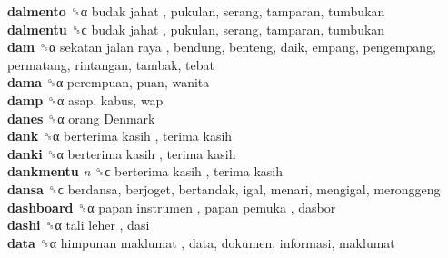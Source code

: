 \textbf{dalmento} ␝α   budak jahat , pukulan, serang, tamparan, tumbukan  \\
\textbf{dalmentu} ␝ϲ   budak jahat , pukulan, serang, tamparan, tumbukan  \\
\textbf{dam} ␝α   sekatan jalan raya , bendung, benteng, daik, empang, pengempang, permatang, rintangan, tambak, tebat  \\
\textbf{dama} ␝α  perempuan, puan, wanita  \\
\textbf{damp} ␝α  asap, kabus, wap  \\
\textbf{danes} ␝α   orang Denmark   \\
\textbf{dank} ␝α   berterima kasih ,  terima kasih   \\
\textbf{danki} ␝α   berterima kasih ,  terima kasih   \\
\textbf{dankmentu} \emph{n}  ␝ϲ   berterima kasih ,  terima kasih   \\
\textbf{dansa} ␝ϲ  berdansa, berjoget, bertandak, igal, menari, mengigal, meronggeng  \\
\textbf{dashboard} ␝α   papan instrumen ,  papan pemuka , dasbor  \\
\textbf{dashi} ␝α   tali leher , dasi  \\
\textbf{data} ␝α   himpunan maklumat , data, dokumen, informasi, maklumat  \\
